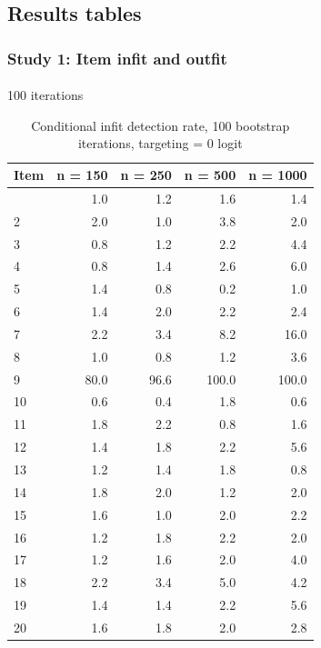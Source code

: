 \documentclass[
  letterpaper,
  DIV=11,
  numbers=noendperiod]{scrartcl}
\makeatletter
\let\oldparagraph\paragraph
\renewcommand{\paragraph}{
    \@ifstar
      \xxxParagraphStar
      \xxxParagraphNoStar
  }
\newcommand{\xxxParagraphStar}[1]{\oldparagraph*{#1}\mbox{}}
\newcommand{\xxxParagraphNoStar}[1]{\oldparagraph{#1}\mbox{}}
\makeatother
\begin{document}
\subsection{Results tables}\label{results-tables}

\subsubsection{Study 1: Item infit and
outfit}\label{sec-tblinfitresults}

\paragraph{100 iterations}\label{iterations}

\begin{longtable}[]{@{}lrrrr@{}}

\caption{\label{tbl-ifbresults1000}Conditional infit detection rate, 100
bootstrap iterations, targeting = 0 logit}

\tabularnewline

\toprule\noalign{}
Item & n = 150 & n = 250 & n = 500 & n = 1000 \\
\midrule\noalign{}
\endhead
\bottomrule\noalign{}
\endlastfoot
1 & 1.0 & 1.2 & 1.6 & 1.4 \\
2 & 2.0 & 1.0 & 3.8 & 2.0 \\
3 & 0.8 & 1.2 & 2.2 & 4.4 \\
4 & 0.8 & 1.4 & 2.6 & 6.0 \\
5 & 1.4 & 0.8 & 0.2 & 1.0 \\
6 & 1.4 & 2.0 & 2.2 & 2.4 \\
7 & 2.2 & 3.4 & 8.2 & 16.0 \\
8 & 1.0 & 0.8 & 1.2 & 3.6 \\
9 & 80.0 & 96.6 & 100.0 & 100.0 \\
10 & 0.6 & 0.4 & 1.8 & 0.6 \\
11 & 1.8 & 2.2 & 0.8 & 1.6 \\
12 & 1.4 & 1.8 & 2.2 & 5.6 \\
13 & 1.2 & 1.4 & 1.8 & 0.8 \\
14 & 1.8 & 2.0 & 1.2 & 2.0 \\
15 & 1.6 & 1.0 & 2.0 & 2.2 \\
16 & 1.2 & 1.8 & 2.2 & 2.0 \\
17 & 1.2 & 1.6 & 2.0 & 4.0 \\
18 & 2.2 & 3.4 & 5.0 & 4.2 \\
19 & 1.4 & 1.4 & 2.2 & 5.6 \\
20 & 1.6 & 1.8 & 2.0 & 2.8 \\

\end{longtable}
\end{document}
